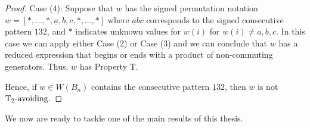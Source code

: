 \begin{lemma}
\begin{proof}
	Case (4): Suppose that $w$ has the signed permutation notation $w=[\ast, \ldots, \ast, \underline{a},b,c, \ast, \ldots, \ast]$ where $\underline{a}bc$ corresponds to the signed consecutive pattern $\underline{1}32$, and $\ast$ indicates unknown values for $w(i)$ for $w(i)\neq a,b,c$. In this case we can apply either Case (2) or Case (3) and we can conclude that $w$ has a reduced expression that begins or ends with a product of non-commuting generators. Thus, $w$ has Property T.
	
	Hence, if $w \in W(B_n)$ contains the consecutive pattern $\underline{1}32$, then $w$ is not $\operatorname{T_2-\mathrm{avoiding}}$.
\end{proof}	
\end{lemma}

We now are ready to tackle one of the main results of this thesis.

